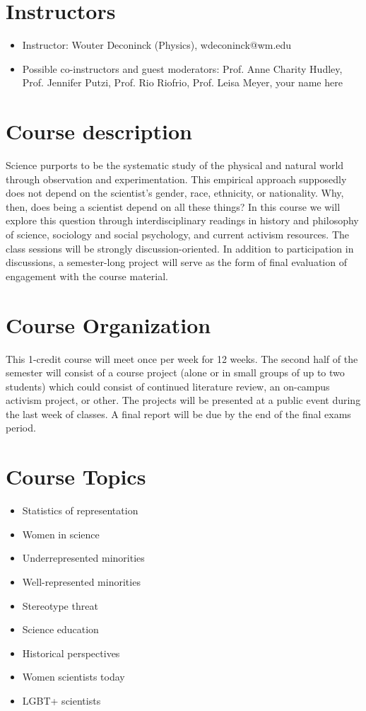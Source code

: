 \documentclass{article}
\begin{document}
\section{Instructors}
\begin{itemize}
\item Instructor: Wouter Deconinck (Physics), wdeconinck@wm.edu
\item Possible co-instructors and guest moderators: Prof. Anne Charity Hudley, Prof. Jennifer Putzi, Prof. Rio Riofrio, Prof. Leisa Meyer, your name here
\end{itemize}

\section{Course description}
Science purports to be the systematic study of the physical and natural world through observation and experimentation. This empirical approach supposedly does not depend on the scientist’s gender, race, ethnicity, or nationality. Why, then, does being a scientist depend on all these things? In this course we will explore this question through interdisciplinary readings in history and philosophy of science, sociology and social psychology, and current activism resources. The class sessions will be strongly discussion-oriented. In addition to participation in discussions, a semester-long project will serve as the form of final evaluation of engagement with the course material.

\section{Course Organization}
This 1-credit course will meet once per week for 12 weeks. The second half of the semester will consist of a course project (alone or in small groups of up to two students) which could consist of continued literature review, an on-campus activism project, or other. The projects will be presented at a public event during the last week of classes. A final report will be due by the end of the final exams period. 

\section{Course Topics}
\begin{itemize}
\item Statistics of representation
\item Women in science
\item Underrepresented minorities
\item Well-represented minorities
\item Stereotype threat
\item Science education
\item Historical perspectives
\item Women scientists today
\item LGBT+ scientists
\end{itemize}
\end{document}
